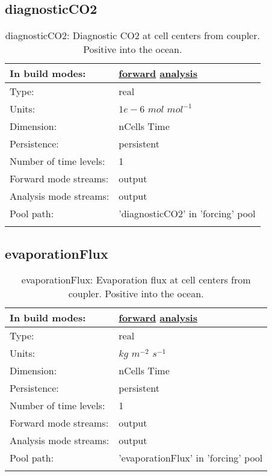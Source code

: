 \subsection[diagnosticCO2]{diagnosticCO2}
\label{subsec:var_sec_forcing_diagnosticCO2}
\begin{center}
\begin{longtable}{| p{2.0in} | p{4.0in} |}
        \hline 
        In build modes: & \hyperref[subsec:forward_var_tab_forcing]{forward} \hyperref[subsec:analysis_var_tab_forcing]{analysis} \\
        \hline 
        Type: & real \\
        \hline 
        Units: & $1e-6$ $mol$ $mol^{-1}$ \\
        \hline 
        Dimension: & nCells Time \\
        \hline 
        Persistence: & persistent \\
        \hline 
        Number of time levels: & 1 \\
        \hline 
		 Forward mode streams: &  output \\
        \hline 
		 Analysis mode streams: &  output \\
        \hline 
            Pool path: & 'diagnosticCO2' in 'forcing' pool
 \\
		 \hline 
    \caption{diagnosticCO2: Diagnostic CO2 at cell centers from coupler. Positive into the ocean.}
\end{longtable}
\end{center}
\subsection[evaporationFlux]{evaporationFlux}
\label{subsec:var_sec_forcing_evaporationFlux}
\begin{center}
\begin{longtable}{| p{2.0in} | p{4.0in} |}
        \hline 
        In build modes: & \hyperref[subsec:forward_var_tab_forcing]{forward} \hyperref[subsec:analysis_var_tab_forcing]{analysis} \\
        \hline 
        Type: & real \\
        \hline 
        Units: & $kg$ $m^{-2}$ $s^{-1}$ \\
        \hline 
        Dimension: & nCells Time \\
        \hline 
        Persistence: & persistent \\
        \hline 
        Number of time levels: & 1 \\
        \hline 
		 Forward mode streams: &  output \\
        \hline 
		 Analysis mode streams: &  output \\
        \hline 
            Pool path: & 'evaporationFlux' in 'forcing' pool
 \\
		 \hline 
    \caption{evaporationFlux: Evaporation flux at cell centers from coupler. Positive into the ocean.}
\end{longtable}
\end{center}

